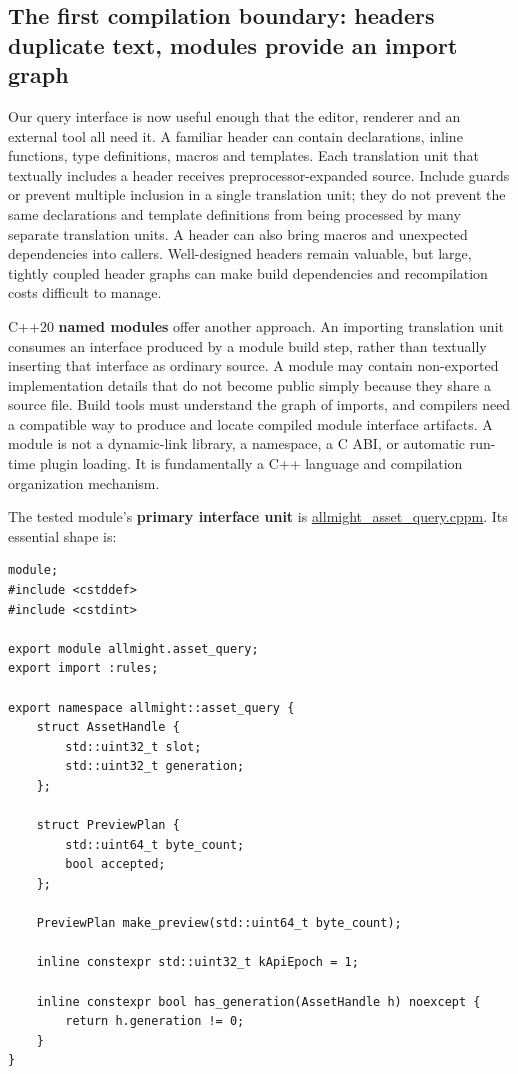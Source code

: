 \subsection{The first compilation boundary: headers duplicate text, modules provide an import graph}\label{01-foundations-i-ch006-the-first-compilation-boundary-headers-duplicate-text-modules-provide-an-import-graph}

\hypertarget{01-foundations-i-ch006-the-first-compilation-boundary-headers-duplicate-text-modules-provide-an-import-graph}{}

Our query interface is now useful enough that the editor, renderer and an external tool all need it. A familiar header can contain declarations, inline functions, type definitions, macros and templates. Each translation unit that textually includes a header receives preprocessor-expanded source. Include guards or  prevent multiple inclusion in a single translation unit; they do not prevent the same declarations and template definitions from being processed by many separate translation units. A header can also bring macros and unexpected dependencies into callers. Well-designed headers remain valuable, but large, tightly coupled header graphs can make build dependencies and recompilation costs difficult to manage.

C++20 \textbf{named modules} offer another approach. An importing translation unit consumes an interface produced by a module build step, rather than textually inserting that interface as ordinary source. A module may contain non-exported implementation details that do not become public simply because they share a source file. Build tools must understand the graph of imports, and compilers need a compatible way to produce and locate compiled module interface artifacts. A module is not a dynamic-link library, a namespace, a C ABI, or automatic run-time plugin loading. It is fundamentally a C++ language and compilation organization mechanism.

The tested module's \textbf{primary interface unit} is \hyperref[source-file-453ba365bb56ed2f6e4c3f8e]{allmight\_asset\_query.cppm}. Its essential shape is:

\begin{verbatim}
module;
#include <cstddef>
#include <cstdint>

export module allmight.asset_query;
export import :rules;

export namespace allmight::asset_query {
    struct AssetHandle {
        std::uint32_t slot;
        std::uint32_t generation;
    };

    struct PreviewPlan {
        std::uint64_t byte_count;
        bool accepted;
    };

    PreviewPlan make_preview(std::uint64_t byte_count);

    inline constexpr std::uint32_t kApiEpoch = 1;

    inline constexpr bool has_generation(AssetHandle h) noexcept {
        return h.generation != 0;
    }
}
\end{verbatim}

